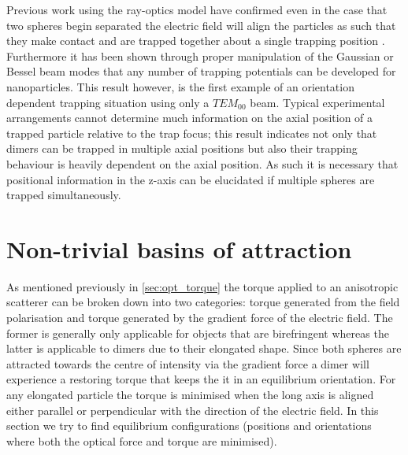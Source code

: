 Previous work using the ray-optics model have confirmed even 
in the case that two spheres begin separated the electric field 
will align the particles as such that they make contact and 
are trapped together about a single trapping position 
\cite{Xu2005}. Furthermore it has been shown through proper 
manipulation of the Gaussian or Bessel beam modes that any 
number of trapping potentials can be developed 
\cite{Shahabadi2020} for nanoparticles. This result however, 
is the first example of an orientation dependent trapping 
situation using only a $TEM_00$ beam. Typical experimental 
arrangements cannot determine much information on the axial 
position of a trapped particle relative to the trap focus; 
this result indicates not only that dimers can be trapped 
in multiple axial positions but also their trapping behaviour 
is heavily dependent on the axial position. As such it is 
necessary that positional information in the z-axis can be 
elucidated if multiple spheres are trapped simultaneously. 

\newpage
\section{Non-trivial basins of attraction}
\label{sec:off-axis}
As mentioned previously in \ref{sec:opt_torque} the 
torque applied to an anisotropic scatterer can be 
broken down into two categories: torque generated 
from the field polarisation and torque generated 
by the gradient force of the electric field. The 
former is generally only applicable for objects 
that are birefringent whereas the latter is 
applicable to dimers due to their elongated shape.
Since both spheres are attracted towards the centre
of intensity via the gradient force a dimer will 
experience a restoring torque that keeps the it
in an equilibrium orientation. For any elongated 
particle the torque is minimised when the long 
axis is aligned either parallel or perpendicular
with the direction of the electric field. In this 
section we try to find equilibrium configurations 
(positions and orientations where both the optical
force and torque are minimised).

